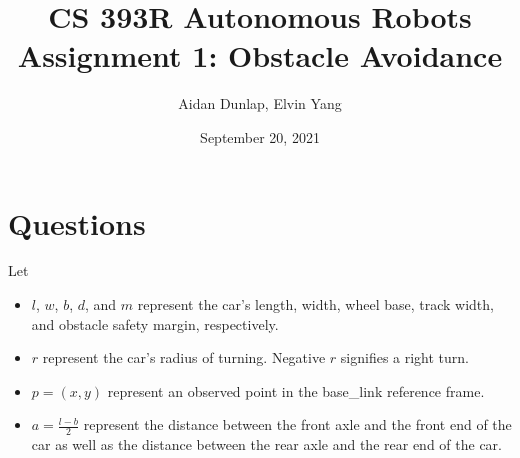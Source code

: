 \documentclass[11pt]{article}
\title{CS 393R Autonomous Robots \\ \large Assignment 1: Obstacle Avoidance}
\author{Aidan Dunlap, Elvin Yang}
\date{September 20, 2021}
\begin{document}
\maketitle

\section{Questions}

Let
\begin{itemize}
    \item
    $l$, $w$, $b$, $d$, and $m$ represent the car's length, width, wheel base,
    track width, and obstacle safety margin, respectively.

    \item
    $r$ represent the car's radius of turning. Negative $r$ signifies a right
    turn.

    \item
    $p = (x, y)$ represent an observed point in the base\_link reference frame.

    \item
    $a = \frac{l - b}{2}$ represent the distance between the front axle and the
    front end of the car as well as the distance between the rear axle and the
    rear end of the car.

\end{itemize}
\end{document}

